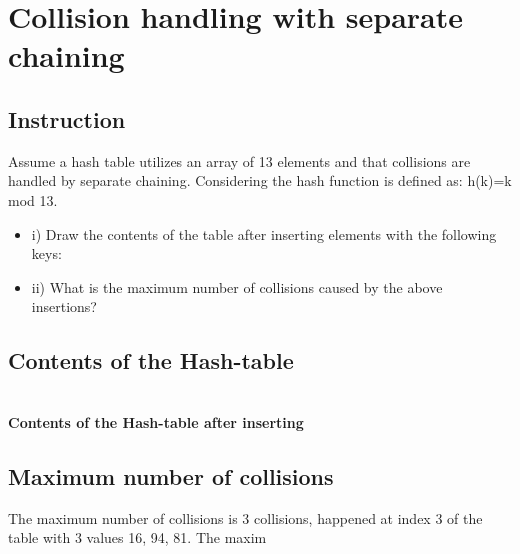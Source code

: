 \section{Collision handling with separate chaining}
\subsection{Instruction}
Assume a hash table utilizes an array of 13 elements and that collisions are handled by separate
chaining. Considering the hash function is defined as: h(k)=k mod 13.
\begin{itemize}
\item i) Draw the contents of the table after inserting elements with the following keys:
\begin{center}
\end{center}
\item ii) What is the maximum number of collisions caused by the above insertions?
\end{itemize}

\subsection{Contents of the Hash-table}
\\
\textbf{Contents of the Hash-table after inserting}

\subsection{Maximum number of collisions}
The maximum number of collisions is 3 collisions, happened at index 3 of the table with 3 values 16, 94, 81. The maxim